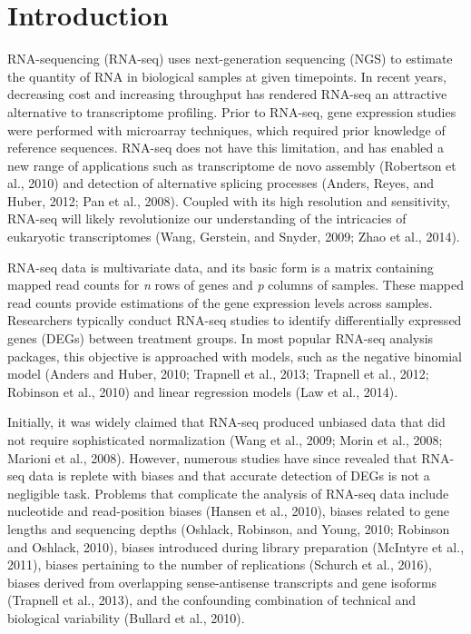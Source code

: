 \documentclass[referee]{biom}
\begin{document}
\section{Introduction}
\label{s:Introduction}

RNA-sequencing (RNA-seq) uses next-generation sequencing (NGS) to estimate the quantity of RNA in biological samples at given timepoints. In recent years, decreasing cost and increasing throughput has rendered RNA-seq an attractive alternative to transcriptome profiling. Prior to RNA-seq, gene expression studies were performed with microarray techniques, which required prior knowledge of reference sequences. RNA-seq does not have this limitation, and has enabled a new range of applications such as transcriptome de novo assembly (Robertson et al., 2010) and detection of alternative splicing processes (Anders, Reyes, and Huber, 2012; Pan et al., 2008). Coupled with its high resolution and sensitivity, RNA-seq will likely revolutionize our understanding of the intricacies of eukaryotic transcriptomes (Wang, Gerstein, and Snyder, 2009; Zhao et al., 2014).

RNA-seq data is multivariate data, and its basic form is a matrix containing mapped read counts for \textit{n} rows of genes and \textit{p} columns of samples. These mapped read counts provide estimations of the gene expression levels across samples. Researchers typically conduct RNA-seq studies to identify differentially expressed genes (DEGs) between treatment groups. In most popular RNA-seq analysis packages, this objective is approached with models, such as the negative binomial model (Anders and Huber, 2010; Trapnell et al., 2013; Trapnell et al., 2012; Robinson et al., 2010) and linear regression models (Law et al., 2014).

Initially, it was widely claimed that RNA-seq produced unbiased data that did not require sophisticated normalization (Wang et al., 2009; Morin et al., 2008; Marioni et al., 2008). However, numerous studies have since revealed that RNA-seq data is replete with biases and that accurate detection of DEGs is not a negligible task. Problems that complicate the analysis of RNA-seq data include nucleotide and read-position biases (Hansen et al., 2010), biases related to gene lengths and sequencing depths (Oshlack, Robinson, and Young, 2010; Robinson and Oshlack, 2010), biases introduced during library preparation (McIntyre et al., 2011), biases pertaining to the number of replications (Schurch et al., 2016), biases derived from overlapping sense-antisense transcripts and gene isoforms (Trapnell et al., 2013), and the confounding combination of technical and biological variability (Bullard et al., 2010).
\end{document}

